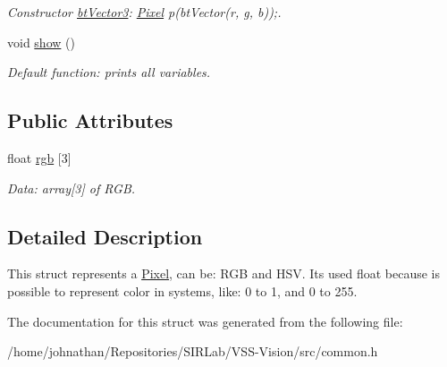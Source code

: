 \begin{DoxyCompactItemize}
\begin{DoxyCompactList}\small\item\em Constructor \hyperlink{structcommon_1_1btVector3}{bt\+Vector3}\+: \hyperlink{structcommon_1_1Pixel}{Pixel} p(bt\+Vector(r, g, b));. \end{DoxyCompactList}\item 
void \hyperlink{structcommon_1_1Pixel_a384d642e3fb610b38c813ff6fd8c50e1}{show} ()\hypertarget{structcommon_1_1Pixel_a384d642e3fb610b38c813ff6fd8c50e1}{}\label{structcommon_1_1Pixel_a384d642e3fb610b38c813ff6fd8c50e1}

\begin{DoxyCompactList}\small\item\em Default function\+: prints all variables. \end{DoxyCompactList}\end{DoxyCompactItemize}
\subsection*{Public Attributes}
\begin{DoxyCompactItemize}
\item 
float \hyperlink{structcommon_1_1Pixel_abf3e7070359fa300aeed9af22c74f118}{rgb} \mbox{[}3\mbox{]}\hypertarget{structcommon_1_1Pixel_abf3e7070359fa300aeed9af22c74f118}{}\label{structcommon_1_1Pixel_abf3e7070359fa300aeed9af22c74f118}

\begin{DoxyCompactList}\small\item\em Data\+: array\mbox{[}3\mbox{]} of R\+GB. \end{DoxyCompactList}\end{DoxyCompactItemize}


\subsection{Detailed Description}
This struct represents a \hyperlink{structcommon_1_1Pixel}{Pixel}, can be\+: R\+GB and H\+SV. It\textquotesingle{}s used float because is possible to represent color in systems, like\+: 0 to 1, and 0 to 255. 

The documentation for this struct was generated from the following file\+:\begin{DoxyCompactItemize}
\item 
/home/johnathan/\+Repositories/\+S\+I\+R\+Lab/\+V\+S\+S-\/\+Vision/src/common.\+h\end{DoxyCompactItemize}
